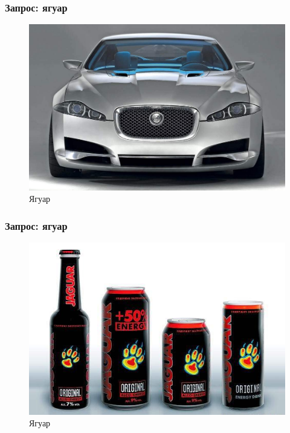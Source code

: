 \documentclass[xetex,mathserif,serif,table]{beamer}
\begin{document}
\begin{frame}
\frametitle{Запрос: ягуар}

\begin{figure}
  \centering
     \includegraphics[width=0.7\paperwidth]{img/jaguar2.jpg}
    \caption{Ягуар}
\end{figure}

\end{frame}

\begin{frame}
\frametitle{Запрос: ягуар}


\begin{figure}
  \centering
     \includegraphics[width=0.7\paperwidth]{img/jaguar3.jpg}
    \caption{Ягуар}
\end{figure}
\end{frame}
\end{document}
